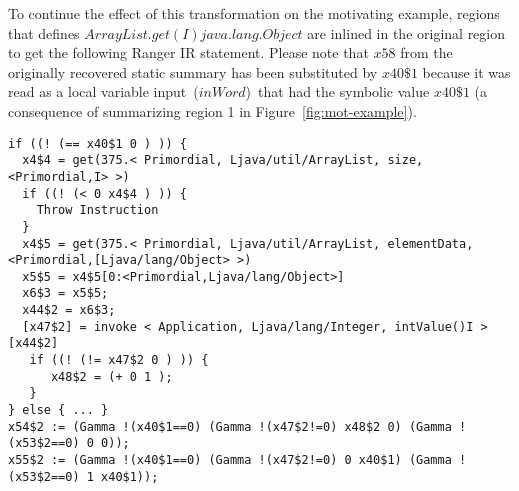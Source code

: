 %
To continue the effect of this transformation on the motivating example, regions that defines
$ArrayList.get(I)java.lang.Object$ are inlined in the original region to get the following Ranger IR statement.
%
Please note that $x58$ from the originally recovered static summary has been substituted by $x40\$1$ because it was
read as a local variable input~($inWord$)~that had the symbolic value $x40\$1$ (a consequence of summarizing region 1 in
Figure~\ref{fig:mot-example}).
%
\begin{lstlisting}
if ((! (== x40$1 0 ) )) {
  x4$4 = get(375.< Primordial, Ljava/util/ArrayList, size, <Primordial,I> >)
  if ((! (< 0 x4$4 ) )) {
    Throw Instruction
  }
  x4$5 = get(375.< Primordial, Ljava/util/ArrayList, elementData, <Primordial,[Ljava/lang/Object> >)
  x5$5 = x4$5[0:<Primordial,Ljava/lang/Object>]
  x6$3 = x5$5;
  x44$2 = x6$3;
  [x47$2] = invoke < Application, Ljava/lang/Integer, intValue()I >[x44$2]
   if ((! (!= x47$2 0 ) )) {
      x48$2 = (+ 0 1 );
   }
} else { ... }
x54$2 := (Gamma !(x40$1==0) (Gamma !(x47$2!=0) x48$2 0) (Gamma !(x53$2==0) 0 0));
x55$2 := (Gamma !(x40$1==0) (Gamma !(x47$2!=0) 0 x40$1) (Gamma !(x53$2==0) 1 x40$1));
\end{lstlisting}
 
